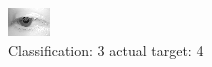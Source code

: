 \begin{figure}[h!]
\begin{center}
\includegraphics[width=0.60\columnwidth]{figures/ID2634_class_3_target_4.png}
\end{center}
\caption{ Classification: 3 actual target: 4}
\label{fig:ID2634_class_3_target_4}
\end{figure}
